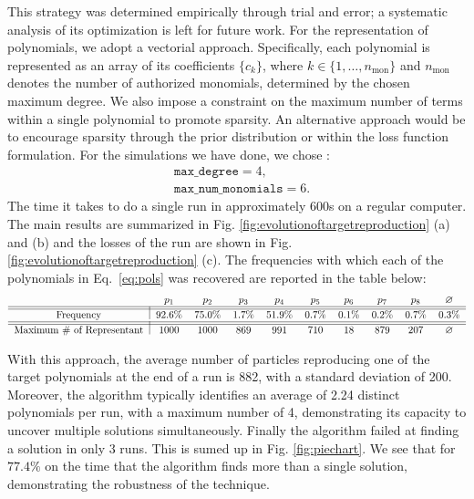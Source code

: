 \documentclass[11pt]{article}
\begin{document}
This strategy was determined empirically through trial and error; a systematic analysis of its optimization is left for future work. For the representation of polynomials, we adopt a vectorial approach. Specifically, each polynomial is represented as an array of its coefficients $\{c_k\}$, where $k \in \{1,\dots,n_{\text{mon}}\}$ and $n_{\text{mon}}$ denotes the number of authorized monomials, determined by the chosen maximum degree. We also impose a constraint on the maximum number of terms within a single polynomial to promote sparsity. An alternative approach would be to encourage sparsity through the prior distribution or within the loss function formulation. For the simulations we have done, we chose : 
\begin{equation}
	\begin{aligned}
	&\texttt{max\_degree} = 4,\\
	&\texttt{max\_num\_monomials} = 6.
\end{aligned}
\end{equation}
The time it takes to do a single run in approximately 600s on a regular computer. The main results are summarized in Fig. \ref{fig:evolutionoftargetreproduction} (a) and (b) and the losses of the run are shown in Fig. \ref{fig:evolutionoftargetreproduction} (c). 
The frequencies with which each of the polynomials in Eq.~\eqref{eq:pols} was recovered are reported in the table below:
  \begin{equation}
  	\label{table:results}
	\begin{tabular}{c|ccccccccc}
		& $p_{1}$ & $p_{2}$ & $p_{3}$ & $p_{4}$ & $p_{5}$ & $p_{6}$ & $p_{7}$ & $p_{8}$ &  $\varnothing$  \\\hline\hline
		Frequency & 92.6\% & 75.0\% & 1.7\% & 51.9\% & 0.7\% & 0.1\% & 0.2\% & 0.7\% & 0.3\% \\\hline\hline
		Maximum \# of Representant & 1000 & 1000 & 869 & 991 & 710 & 18 & 879 & 207 & $\varnothing$
		
	\end{tabular}
\end{equation}

With this approach, the average number of particles reproducing one of the target polynomials at the end of a run is 882, with a standard deviation of 200. Moreover, the algorithm typically identifies an average of 2.24 distinct polynomials per run, with a maximum number of 4, demonstrating its capacity to uncover multiple solutions simultaneously. Finally the algorithm failed at finding a solution in only 3 runs. This is sumed up in Fig. \ref{fig:piechart}. We see that for $77.4\%$ on the time that the algorithm finds more than a single solution, demonstrating the robustness of the technique. 
\end{document}
